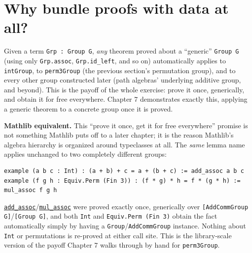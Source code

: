 \section{Why bundle proofs with data at all?}\label{sec:06-groups:06-why-bundle:1}

Given a term \texttt{Grp : Group G}, \emph{any} theorem proved about a ``generic'' \texttt{Group G} (using only \texttt{Grp.assoc}, \texttt{Grp.id\_\allowbreak{}left}, and so on) automatically applies to \texttt{intGroup}, to \texttt{perm3Group} (the previous section's permutation group), and to every other group constructed later (path algebras' underlying additive group, and beyond). This is the payoff of the whole exercise: prove it once, generically, and obtain it for free everywhere. Chapter 7 demonstrates exactly this, applying a generic theorem to a concrete group once it is proved.

\textbf{Mathlib equivalent.} This ``prove it once, get it for free everywhere'' promise is not something Mathlib puts off to a later chapter; it is the reason Mathlib's algebra hierarchy is organized around typeclasses at all. The \emph{same} lemma name applies unchanged to two completely different groups:

\begin{lstlisting}
example (a b c : Int) : (a + b) + c = a + (b + c) := add_assoc a b c
example (f g h : Equiv.Perm (Fin 3)) : (f * g) * h = f * (g * h) := mul_assoc f g h
\end{lstlisting}

\href{https://loogle.lean-lang.org/?q=add_assoc}{\texttt{add\_\allowbreak{}assoc}}/\href{https://loogle.lean-lang.org/?q=mul_assoc}{\texttt{mul\_\allowbreak{}assoc}} were proved exactly once, generically over \texttt{[AddCommGroup G]}/\texttt{[Group G]}, and both \texttt{Int} and \texttt{Equiv.Perm (Fin 3)} obtain the fact automatically simply by having a \texttt{Group}/\texttt{AddCommGroup} instance. Nothing about \texttt{Int} or permutations is re-proved at either call site. This is the library-scale version of the payoff Chapter 7 walks through by hand for \texttt{perm3Group}.
